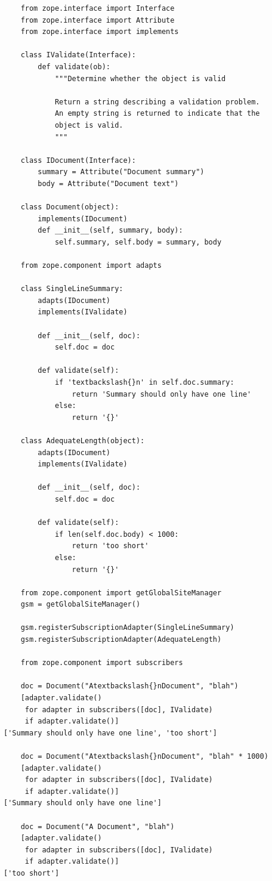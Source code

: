 \documentclass[a4paper,openany,twoside,draft]{book}
\begin{document}
\begin{verbatim}
    from zope.interface import Interface
    from zope.interface import Attribute
    from zope.interface import implements

    class IValidate(Interface):
        def validate(ob):
            """Determine whether the object is valid

            Return a string describing a validation problem.
            An empty string is returned to indicate that the
            object is valid.
            """

    class IDocument(Interface):
        summary = Attribute("Document summary")
        body = Attribute("Document text")

    class Document(object):
        implements(IDocument)
        def __init__(self, summary, body):
            self.summary, self.body = summary, body

    from zope.component import adapts

    class SingleLineSummary:
        adapts(IDocument)
        implements(IValidate)

        def __init__(self, doc):
            self.doc = doc

        def validate(self):
            if 'textbackslash{}n' in self.doc.summary:
                return 'Summary should only have one line'
            else:
                return '{}'

    class AdequateLength(object):
        adapts(IDocument)
        implements(IValidate)

        def __init__(self, doc):
            self.doc = doc

        def validate(self):
            if len(self.doc.body) < 1000:
                return 'too short'
            else:
                return '{}'

    from zope.component import getGlobalSiteManager
    gsm = getGlobalSiteManager()

    gsm.registerSubscriptionAdapter(SingleLineSummary)
    gsm.registerSubscriptionAdapter(AdequateLength)

    from zope.component import subscribers

    doc = Document("Atextbackslash{}nDocument", "blah")
    [adapter.validate()
     for adapter in subscribers([doc], IValidate)
     if adapter.validate()]
['Summary should only have one line', 'too short']

    doc = Document("Atextbackslash{}nDocument", "blah" * 1000)
    [adapter.validate()
     for adapter in subscribers([doc], IValidate)
     if adapter.validate()]
['Summary should only have one line']

    doc = Document("A Document", "blah")
    [adapter.validate()
     for adapter in subscribers([doc], IValidate)
     if adapter.validate()]
['too short']
\end{verbatim}
\end{document}

